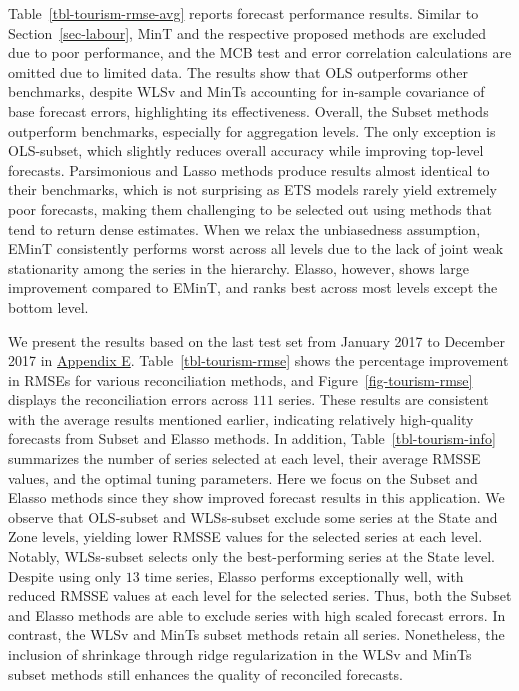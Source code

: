 \documentclass[
  11pt]{article}
\theoremstyle{plain}
\theoremstyle{remark}
\begin{document}
Table~\ref{tbl-tourism-rmse-avg} reports forecast performance results.
Similar to Section~\ref{sec-labour}, MinT and the respective proposed
methods are excluded due to poor performance, and the MCB test and error
correlation calculations are omitted due to limited data. The results
show that OLS outperforms other benchmarks, despite WLSv and MinTs
accounting for in-sample covariance of base forecast errors,
highlighting its effectiveness. Overall, the Subset methods outperform
benchmarks, especially for aggregation levels. The only exception is
OLS-subset, which slightly reduces overall accuracy while improving
top-level forecasts. Parsimonious and Lasso methods produce results
almost identical to their benchmarks, which is not surprising as ETS
models rarely yield extremely poor forecasts, making them challenging to
be selected out using methods that tend to return dense estimates. When
we relax the unbiasedness assumption, EMinT consistently performs worst
across all levels due to the lack of joint weak stationarity among the
series in the hierarchy. Elasso, however, shows large improvement
compared to EMinT, and ranks best across most levels except the bottom
level.

We present the results based on the last test set from January 2017 to
December 2017 in \hyperref[appendix-tourism]{Appendix E}.
Table~\ref{tbl-tourism-rmse} shows the percentage improvement in RMSEs
for various reconciliation methods, and Figure~\ref{fig-tourism-rmse}
displays the reconciliation errors across \(111\) series. These results
are consistent with the average results mentioned earlier, indicating
relatively high-quality forecasts from Subset and Elasso methods. In
addition, Table~\ref{tbl-tourism-info} summarizes the number of series
selected at each level, their average RMSSE values, and the optimal
tuning parameters. Here we focus on the Subset and Elasso methods since
they show improved forecast results in this application. We observe that
OLS-subset and WLSs-subset exclude some series at the State and Zone
levels, yielding lower RMSSE values for the selected series at each
level. Notably, WLSs-subset selects only the best-performing series at
the State level. Despite using only \(13\) time series, Elasso performs
exceptionally well, with reduced RMSSE values at each level for the
selected series. Thus, both the Subset and Elasso methods are able to
exclude series with high scaled forecast errors. In contrast, the WLSv
and MinTs subset methods retain all series. Nonetheless, the inclusion
of shrinkage through ridge regularization in the WLSv and MinTs subset
methods still enhances the quality of reconciled forecasts.
\end{document}
